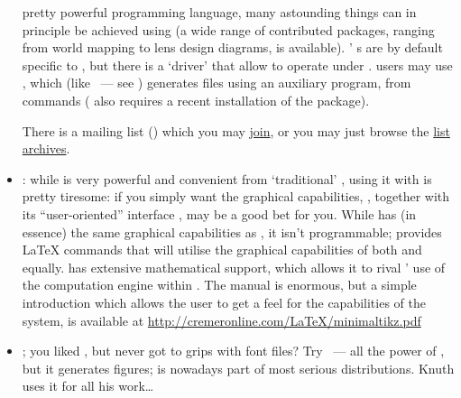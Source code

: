 \begin{itemize}
  pretty powerful programming language, many astounding things can in
  principle be achieved using  (a wide range of
  contributed packages, ranging from world mapping to lens design
  diagrams, is available).
  ' s are
  by default specific to , but there is
  a  `driver' that allow  to
  operate under \xetex{}.  \PDFTeX{} users may use ,
  which (like ~--- see %
  ) generates
   files using an auxiliary program, from 
  commands ( also requires a recent installation of
  the  package).

  There is a  mailing list
  () which you may
  \href{http://tug.org/mailman/listinfo/pstricks}{join}, or you may
  just browse the %
  \href{http://tug.org/pipermail/pstricks/}{list archives}.
\item {}: while  is very powerful and
  convenient from `traditional' \tex{}, using it with \PDFLaTeX{} is
  pretty tiresome: if you 
  simply want the graphical capabilities, , together with
  its ``user-oriented'' interface , may be a good
  bet for you.  While  has (in essence) the same graphical
  capabilities as \PS{}, it isn't programmable;  provides
  \LaTeX{} commands that will utilise the graphical capabilities of
  both \PS{} and  equally.   has extensive
  mathematical support, which allows it to rival '
  use of the computation engine within \PS{}.
  The  manual is enormous, but a simple introduction which
  allows the user to get a feel for the capabilities of the system, is
  available at \url{http://cremeronline.com/LaTeX/minimaltikz.pdf}
\item \MP{}; you liked \MF{}, but never got to grips with font files?
  Try ~---
  all the power of \MF{}, but it generates \PS{} figures; \MP{}
  is nowadays part of most serious \AllTeX{} distributions.  Knuth
  uses it for all his work\dots{}


\end{itemize}
